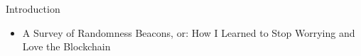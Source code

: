 \begin{frame}{Introduction}
    \begin{itemize}
        \item A Survey of Randomness Beacons, or: How I Learned to Stop Worrying and Love the Blockchain
    \end{itemize}        
\end{frame}
